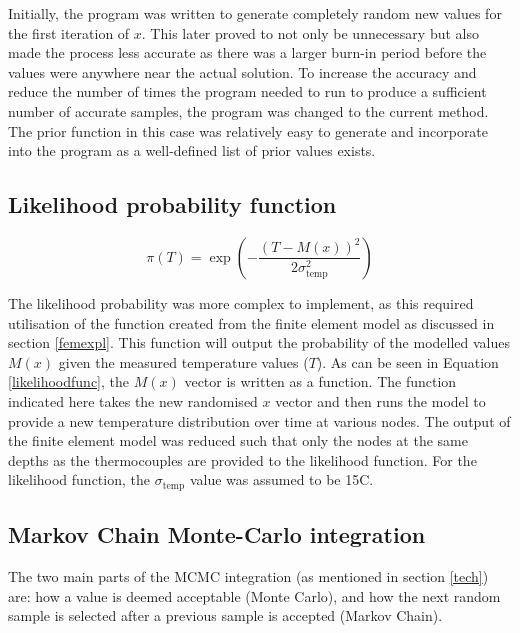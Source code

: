 Initially, the program was written to generate completely random new values for the first iteration of $x$. 
This later proved to not only be unnecessary but also made the process less accurate as there was a larger burn-in period before the values were anywhere near the actual solution.
To increase the accuracy and reduce the number of times the program needed to run to produce a sufficient number of accurate samples, the program was changed to the current method.
The prior function in this case was relatively easy to generate and incorporate into the program as a well-defined list of prior values exists.

	\subsection{Likelihood probability function}
		\begin{equation}
		\label{likelihoodfunc}
		\pi(T) = \exp\left(-\frac{\left(T-M(x)\right)^2}{2\sigma_{\text{temp}}^2}\right)
		\end{equation}
		
		The likelihood probability was more complex to implement, as this required utilisation of the function created from the finite element model as discussed in section \ref{femexpl}.
		This function will output the probability of the modelled values $M(x)$ given the measured temperature values ($T$).
		As can be seen in Equation \ref{likelihoodfunc}, the $M(x)$ vector is written as a function.
		The function indicated here takes the new randomised $x$ vector and then runs the model to provide a new temperature distribution over time at various nodes.
		The output of the finite element model was reduced such that only the nodes at the same depths as the thermocouples are provided to the likelihood function.
		For the likelihood function, the $\sigma_{\text{temp}}$ value was assumed to be 15\textdegree C.
		 

	\subsection{Markov Chain Monte-Carlo integration}\label{mcmcexp}
	The two main parts of the MCMC integration (as mentioned in section \ref{tech}) are: how a value is deemed acceptable (Monte Carlo), and how the next random sample is selected after a previous sample is accepted (Markov Chain).
	
